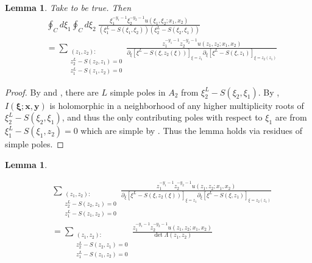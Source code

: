 \documentclass[a4paper,11pt]{article}
\newtheorem{lemma}[theorem]{Lemma}
\theoremstyle{definition}
\begin{document}
\begin{lemma} \label{l: contour to residue sums}
Take  to be true. Then
    \begin{equation}
        \begin{split}
            &\oint_C d\xi_1 \oint_C d\xi_2 \ \frac{\xi_1^{-y_1-1}\xi_2^{-y_2-1}u(\xi_1,\xi_2; x_1,x_2)}{\left( \xi_1^L-S(\xi_1,\xi_2) \right)\left( \xi_2^L-S(\xi_2,\xi_1) \right)} \\
            &= \sum_{\substack{(z_1,z_2):\\ z_2^L-S(z_2,z_1) =0
            \\ z_1^L-S(z_1,z_2)=0}} \frac{z_1^{-y_1-1}z_2^{-y_2-1}u(z_1,z_2; x_1,x_2)}{\partial_{\xi}\left[\xi^L-S(\xi,z_2(\xi))\right]_{\xi=z_1}\partial_{\xi}\left[\xi^L-S(\xi,z_1)\right]_{\xi=z_2(z_1)}} 
        \end{split}
    \end{equation}
\end{lemma}
\begin{proof}
    By  and , there are $L$ simple poles in $A_2$ from $\xi_2^L-S(\xi_2,\xi_1)$. By , $I(\boldsymbol{\xi};\textbf{x},\textbf{y})$ is holomorphic in a neighborhood of any higher multiplicity roots of $\xi_2^L-S(\xi_2,\xi_1)$, and thus the only contributing poles with respect to $\xi_1$ are from $\xi_1^L-S(\xi_1,z_2)=0$ which are simple by . Thus the lemma holds via residues of simple poles.  
\end{proof}


\begin{lemma} \label{l: multipart sums}

    \begin{equation}
    \begin{split}
        &\sum_{\substack{(z_1,z_2):\\ z_2^L-S(z_2,z_1) =0
            \\ z_1^L-S(z_1,z_2)=0}} \frac{z_1^{-y_1-1}z_2^{-y_2-1}u(z_1,z_2; x_1,x_2)}{\partial_{\xi}\left[\xi^L-S(\xi,z_2(\xi))\right]_{\xi=z_1}\partial_{\xi}\left[\xi^L-S(\xi,z_1)\right]_{\xi=z_2(z_1)}} \\
            &= \sum_{\substack{(z_1,z_2):\\ z_2^L-S(z_2,z_1) =0
            \\ z_1^L-S(z_1,z_2)=0}} \frac{z_1^{-y_1-1}z_2^{-y_2-1}u(z_1,z_2; x_1,x_2)}{\det \Lambda(z_1,z_2)}
    \end{split}
    \end{equation}
   
\end{lemma}
\end{document}
